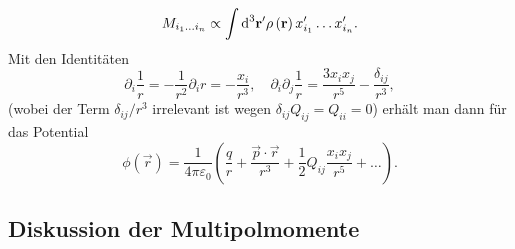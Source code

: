 \begin{equation*}
	M_{{i_{1}}\ldots {i_{n}}}\propto \int \text{d} ^{3}\mathbf{r}'\rho \left(\mathbf{r}\right)x_{i_{1}}'\ldots x_{i_{n}}'.
\end{equation*}
Mit den Identitäten
\begin{equation*}
	\partial _{i}\frac{1}{r}=-\frac{1}{r^{2}}\partial _{i}r=-\frac{x_{i}}{r^{3}},\quad \partial _{i}\partial _{j}\frac{1}{r}=\frac{3x_{i}x_{j}}{r^{5}}-\frac{\delta _{ij}}{r^{3}},
\end{equation*}
(wobei der Term $\delta_{ij}/r^3$ irrelevant ist wegen $\delta _{ij}Q_{ij}=Q_{ii}=0$) erhält man dann für das Potential
\begin{equation*}
	\phi \left(\vec {r}\right)=\frac{1}{4\pi \varepsilon _{0}}\left(\frac{q}{r}+\frac{\vec {p}\cdot \vec {r}}{r^{3}}+\frac{1}{2}Q_{ij}\frac{x_{i}x_{j}}{r^{5}}+\ldots \right).
\end{equation*}



\subsection{Diskussion der Multipolmomente}

